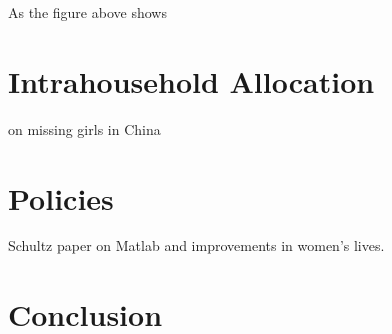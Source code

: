 \documentclass[letterpaper,12pt]{article}
\begin{document}
As the figure above shows 


\citet{Dupas2017}


\section{Intrahousehold Allocation}

\cite{merli00} on missing girls in China


\section{Policies}


Schultz paper on Matlab and improvements in women's lives.

\section{Conclusion}




\end{document}
